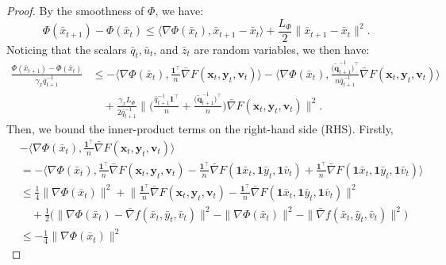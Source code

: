 \documentclass{article}
\theoremstyle{plain}
\theoremstyle{definition}
\theoremstyle{remark}
\begin{document}
\begin{proof}
By the smoothness of $\Phi$, we have:
\begin{equation}
    \Phi(\bar{x}_{t+1}) - \Phi(\bar{x}_t) \leq \langle \nabla \Phi(\bar{x}_t), \bar{x}_{t+1} - \bar{x}_t \rangle 
+ \frac{L_\Phi}{2} \|\bar{x}_{t+1} - \bar{x}_t\|^2.\label{eq32}
\end{equation}
Noticing that the scalars $\bar{q}_t, \bar{u}_t$, and $\bar{z}_t$ are random variables, we then have:
\begin{align}
\frac{\Phi(\bar{x}_{t+1}) - \Phi(\bar{x}_t)}{\gamma_x \bar{q}_{t+1}^{-1}}
&\leq -\Bigg\langle \nabla \Phi(\bar{x}_t), \frac{\mathbf{1}^\top}{n} \bar{\nabla} F(\mathbf{x}_t, \mathbf{y}_t, \mathbf{v}_t) \Bigg\rangle - \Bigg\langle \nabla \Phi(\bar{x}_t), \frac{\big(\tilde{\mathbf{q}}_{t+1}^{-1}\big)^\top}{n\bar{q}_{t+1}^{-1}} \bar{\nabla} F(\mathbf{x}_t, \mathbf{y}_t, \mathbf{v}_t) \Bigg\rangle \nonumber \\
&\quad + \frac{\gamma_x L_\Phi}{2\bar{q}_{t+1}^{-1}}  \bigg\|\bigg(\frac{\bar{q}_{t+1}^{-1}\mathbf{1}^\top}{n} 
+ \frac{\big(\tilde{\mathbf{q}}_{t+1}^{-1}\big)^\top}{n} \bigg)\bar{\nabla} F(\mathbf{x}_t, \mathbf{y}_t, \mathbf{v}_t)\bigg\|^2.\label{eq33}
\end{align}
Then, we bound the inner-product terms on the right-hand side (RHS). Firstly,
\begin{align}
&-\Bigg\langle \nabla \Phi(\bar{x}_t), \frac{\mathbf{1}^\top}{n} \bar{\nabla} F(\mathbf{x}_t, \mathbf{y}_t, \mathbf{v}_t) \Bigg\rangle \nonumber \\
&= -\Bigg\langle \nabla \Phi(\bar{x}_t), \frac{\mathbf{1}^\top}{n} \bar{\nabla} F(\mathbf{x}_t, \mathbf{y}_t, \mathbf{v}_t) - \frac{\mathbf{1}^\top}{n}\bar{\nabla} F(\mathbf{1}\bar{x}_t, \mathbf{1}\bar{y}_t, \mathbf{1}\bar{v}_t) + \frac{\mathbf{1}^\top}{n}\bar{\nabla} F(\mathbf{1}\bar{x}_t, \mathbf{1}\bar{y}_t, \mathbf{1}\bar{v}_t) \Bigg\rangle \nonumber \\
&\leq \frac{1}{4}\|\nabla \Phi(\bar{x}_t)\|^2
+ \bigg\|\frac{\mathbf{1}^\top}{n} \bar{\nabla} F(\mathbf{x}_t, \mathbf{y}_t, \mathbf{v}_t) - \frac{\mathbf{1}^\top}{n}\bar{\nabla} F(\mathbf{1}\bar{x}_t, \mathbf{1}\bar{y}_t, \mathbf{1}\bar{v}_t)\bigg\|^2 \nonumber \\
&\quad + \frac{1}{2}\bigg(\|\nabla \Phi(\bar{x}_t) -\bar{\nabla} f(\bar{x}_t, \bar{y}_t, \bar{v}_t)\|^2
- \|\nabla \Phi(\bar{x}_t)\|^2 - \|\bar{\nabla} f(\bar{x}_t, \bar{y}_t, \bar{v}_t)\|^2\bigg) \nonumber \\
&\leq -\frac{1}{4}\|\nabla \Phi(\bar{x}_t)\|^2

\end{align}
\end{proof}
\end{document}
